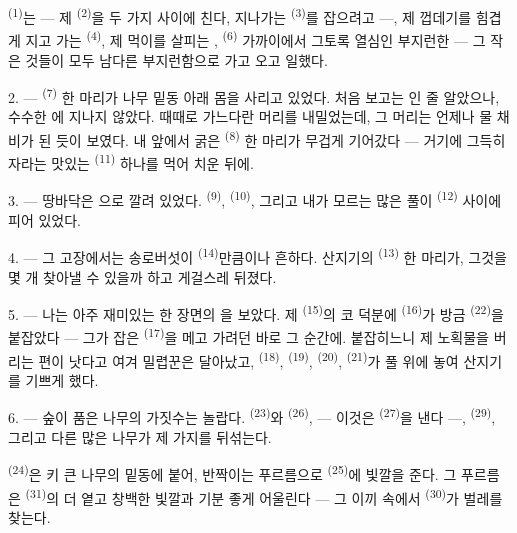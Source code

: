  \textsuperscript{(1)}는 — 제  \textsuperscript{(2)}을 두 가지
사이에 친다, 지나가는  \textsuperscript{(3)}를 잡으려고 —, 제 껍데기를 힘겹게
지고 가는  \textsuperscript{(4)}, 제 먹이를 살피는 ,
 \textsuperscript{(6)} 가까이에서 그토록 열심인 부지런한  —
그 작은 것들이 모두 남다른 부지런함으로 가고 오고 일했다.

2. ---  \textsuperscript{(7)} 한 마리가 나무 밑동 아래 몸을 사리고 있었다.
처음 보고는 인 줄 알았으나, 수수한 에 지나지 않았다.
때때로 가느다란 머리를 내밀었는데, 그 머리는 언제나 물 채비가 된 듯이 보였다. 내 앞에서
굵은  \textsuperscript{(8)} 한 마리가 무겁게 기어갔다 — 거기에 그득히
자라는 맛있는  \textsuperscript{(11)} 하나를 먹어 치운 뒤에.

3. --- 땅바닥은 으로 깔려 있었다.  \textsuperscript{(9)},
 \textsuperscript{(10)}, 그리고 내가 모르는 많은 풀이 
\textsuperscript{(12)} 사이에 피어 있었다.

4. --- 그 고장에서는 송로버섯이  \textsuperscript{(14)}만큼이나 흔하다.
산지기의  \textsuperscript{(13)} 한 마리가, 그것을 몇 개 찾아낼 수 있을까
하고 게걸스레 뒤졌다.

\VUsaut{3.0mm}
\VUsaut{3.0mm}

5. --- 나는 아주 재미있는 한 장면의 을 보았다. 제 
\textsuperscript{(15)}의 코 덕분에  \textsuperscript{(16)}가 방금
 \textsuperscript{(22)}을 붙잡았다 — 그가 잡은 
\textsuperscript{(17)}을 메고 가려던 바로 그 순간에. 붙잡히느니 제 노획물을 버리는 편이
낫다고 여겨 밀렵꾼은 달아났고,  \textsuperscript{(18)},
 \textsuperscript{(19)},  \textsuperscript{(20)},
 \textsuperscript{(21)}가 풀 위에 놓여 산지기를 기쁘게 했다.

6. --- 숲이 품은 나무의 가짓수는 놀랍다.  \textsuperscript{(23)}와
 \textsuperscript{(26)},  — 이것은 
\textsuperscript{(27)}을 낸다 —,  \textsuperscript{(29)}, 그리고 다른 많은
나무가 제 가지를 뒤섞는다.

 \textsuperscript{(24)}은 키 큰 나무의 밑동에 붙어, 반짝이는 푸르름으로
 \textsuperscript{(25)}에 빛깔을 준다. 그 푸르름은 
\textsuperscript{(31)}의 더 옅고 창백한 빛깔과 기분 좋게 어울린다 — 그 이끼 속에서
 \textsuperscript{(30)}가 벌레를 찾는다.


